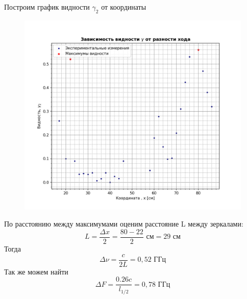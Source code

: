 \documentclass[a4paper, 12pt]{article}
\begin{document}
Построим график видности $\gamma_2$ от координаты
\begin{figure}[H]
    \centering
    \includegraphics[width=1\textwidth]{plot4--5--2-2.png}
    \label{fig:plot2}
\end{figure}
По расстоянию между максимумами оценим расстояние L между зеркалами:
\begin{equation*}
	L = \frac{\Delta x}{2} = \frac{80 - 22}{2} \text{ см} = 29 \text{ см}
\end{equation*}
Тогда
\begin{equation*}
	\Delta \nu = \frac{c}{2L} = 0,52 \text{ ГГц}
\end{equation*}
Так же можем найти
\begin{equation*}
	\Delta F = \frac{0.26c}{l_{1/2}} = 0,78 \text{ ГГц}
\end{equation*}
\end{document}
